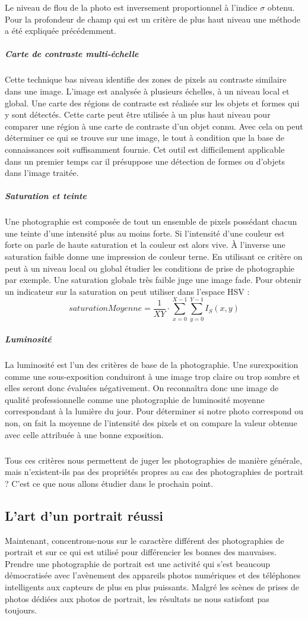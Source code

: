 \documentclass[11pt, french,screen]{report-rd-info}
\begin{document}
Le niveau de flou de la photo est inversement proportionnel à l’indice $\sigma$ obtenu. Pour la profondeur de champ qui est un critère de plus haut niveau une méthode a été expliquée précédemment.

\subparagraph{Carte de contraste multi-échelle}
Cette technique bas niveau identifie des zones de pixels au contraste similaire dans une image. L’image est analysée à plusieurs échelles, à un niveau local et global. Une carte des régions de contraste est réalisée sur les objets et formes qui y sont détectés. Cette carte peut être utilisée à un plus haut niveau pour comparer une région à une carte de contraste d’un objet connu. Avec cela on peut déterminer ce qui se trouve sur une image, le tout à condition que la base de connaissances soit suffisamment fournie. Cet outil est difficilement applicable dans un premier temps car il présuppose une détection de formes ou d’objets dans l’image traitée.
\subparagraph{Saturation et teinte}
Une photographie est composée de tout un ensemble de pixels possédant chacun une teinte d’une intensité plus au moins forte. Si l’intensité d’une couleur est forte on parle de haute saturation et la couleur est alors vive. À l’inverse une saturation faible donne une impression de couleur terne. En utilisant ce critère on peut à un niveau local ou global étudier les conditions de prise de photographie par exemple. Une saturation globale très faible juge une image fade. Pour obtenir un indicateur sur la saturation on peut utiliser dans l'espace HSV : 
\begin{equation}
saturationMoyenne = \frac{1}{XY}\cdot \sum_{x=0}^{X-1} \sum_{y=0}^{Y-1} I_S(x,y)  
\end{equation}

\subparagraph{Luminosité}
La luminosité est l’un des critères de base de la photographie. Une surexposition  comme une sous-exposition conduiront à une image trop claire ou trop sombre et elles seront donc évaluées négativement. On reconnaîtra donc une image de qualité professionnelle comme une photographie de luminosité moyenne correspondant à la lumière du jour. Pour déterminer si notre photo correspond ou non, on fait la moyenne de l’intensité des pixels et on compare la valeur obtenue avec celle attribuée à une bonne exposition.
\subparagraph{}
Tous ces critères nous permettent de juger les photographies de manière générale, mais n'existent-ils pas des propriétés propres au cas des photographies de portrait ? C'est ce que nous allons étudier dans le prochain point.
\subsection{L’art d’un portrait réussi}
Maintenant, concentrons-nous sur le caractère différent des photographies de portrait et sur ce qui est utilisé pour différencier les bonnes des mauvaises.
Prendre une photographie de portrait est une activité qui s'est beaucoup démocratisée avec l'avènement des appareils photos numériques et des téléphones intelligents aux capteurs de plus en plus puissants. Malgré les scènes de prises de photos dédiées aux photos de portrait, les résultats ne nous satisfont pas toujours.
\end{document}
